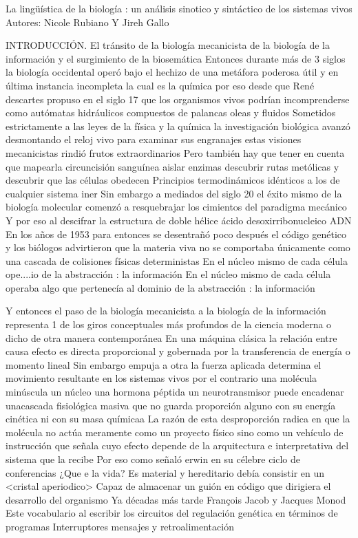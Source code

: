 La lingüística de la biología : un análisis sinotico y sintáctico de los sistemas vivos
Autores: Nicole Rubiano Y Jireh Gallo

INTRODUCCIÓN. El tránsito de la biología mecanicista de la biología de la información y el surgimiento de la biosemática 
Entonces durante más de 3 siglos la biología occidental operó bajo el hechizo de una metáfora poderosa útil y en última instancia incompleta la cual es la química por eso desde que René descartes propuso en el siglo 17 que los organismos vivos podrían incomprenderse como autómatas hidráulicos compuestos de palancas oleas y fluidos Sometidos estrictamente a las leyes de la física y la química la investigación biológica avanzó desmontando el reloj vivo para examinar sus engranajes estas visiones mecanicistas rindió frutos extraordinarios
Pero también hay que tener en cuenta que mapearla circuncisión sanguínea aislar enzimas descubrir rutas metólicas y descubrir que las células obedecen Principios termodinámicos idénticos a los de cualquier sistema iner
Sin embargo a mediados del siglo 20 el éxito mismo de la biología molecular comenzó a resquebrajar los cimientos del paradigma mecánico
Y por eso al descifrar la estructura de doble hélice ácido desoxirribonucleico ADN En los años de 1953 para entonces se desentrañó poco después el código genético y los biólogos advirtieron que la materia viva no se comportaba únicamente como una cascada de colisiones físicas deterministas 
En el núcleo mismo de cada célula ope....io de la abstracción : la información
En el núcleo mismo de cada célula operaba algo que pertenecía al dominio de la abstracción : la información

Y entonces el paso de la biología mecanicista a la biología de la información representa 1 de los giros conceptuales más profundos de la ciencia moderna o dicho de otra manera contemporánea 
En una máquina clásica la relación entre causa efecto es directa proporcional y gobernada por la transferencia de energía o momento lineal
Sin embargo empuja a otra la fuerza aplicada determina el movimiento resultante en los sistemas vivos por el contrario una molécula minúscula un núcleo una hormona péptida un neurotransmisor puede encadenar unacascada fisiológica masiva que no guarda proporción alguno con su energía cinética ni con su masa químicaa
La razón de esta desproporción radica en que la molécula no actúa meramente como un proyecto físico sino como un vehículo de instrucción que señala cuyo efecto depende de la arquitectura e interpretativa del sistema que la recibe 
Por eso como señaló erwin en su célebre ciclo de conferencias ¿Que e la vida? Es material y hereditario debía consistir en un <cristal aperiodico> Capaz de almacenar un guión en código que dirigiera el desarrollo del organismo
Ya décadas más tarde François Jacob y Jacques Monod Este vocabulario al escribir los circuitos del regulación genética en términos de programas Interruptores mensajes y retroalimentación

